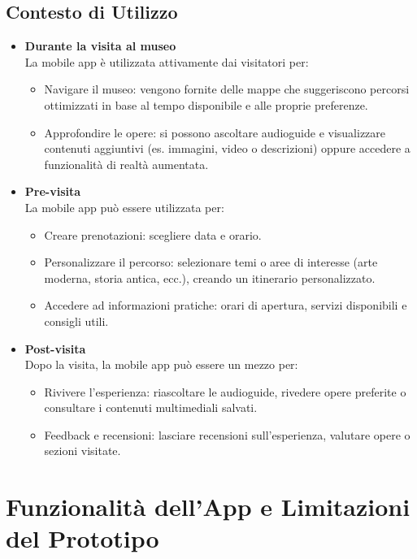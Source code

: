 \documentclass{article}
\begin{document}
\subsection{Contesto di Utilizzo}
\begin{itemize}

\item \textbf{Durante la visita al museo} \\
La mobile app è utilizzata attivamente dai visitatori per:
\begin{itemize}
\item Navigare il museo: vengono fornite delle mappe che suggeriscono percorsi ottimizzati in base al tempo disponibile e alle proprie preferenze.
\item Approfondire le opere: si possono ascoltare audioguide e visualizzare contenuti aggiuntivi (es. immagini, video o descrizioni) oppure accedere a funzionalità di realtà aumentata.
\end{itemize}

\item \textbf{Pre-visita} \\
La mobile app può essere utilizzata per:
\begin{itemize}
\item Creare prenotazioni: scegliere data e orario.
\item Personalizzare il percorso: selezionare temi o aree di interesse (arte moderna, storia antica, ecc.), creando un itinerario personalizzato.
\item Accedere ad informazioni pratiche: orari di apertura, servizi disponibili e consigli utili.
\end{itemize}

\item \textbf{Post-visita} \\
Dopo la visita, la mobile app può essere un mezzo per:
\begin{itemize}
\item Rivivere l’esperienza: riascoltare le audioguide, rivedere opere preferite o consultare i contenuti multimediali salvati.
\item Feedback e recensioni: lasciare recensioni sull’esperienza, valutare opere o sezioni visitate.
\end{itemize}

\end{itemize}

\section{Funzionalità dell'App e Limitazioni del Prototipo}
\end{document}
